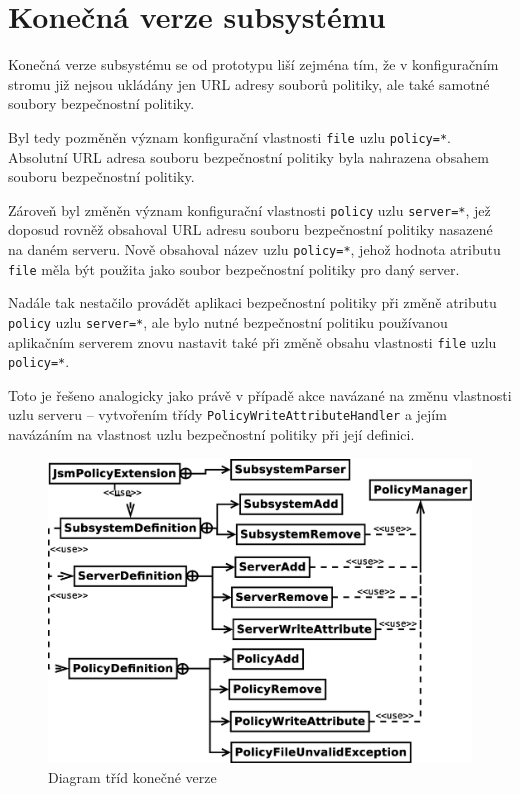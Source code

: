 \section{Konečná verze subsystému}

Konečná verze subsystému se od prototypu liší zejména tím, že v konfiguračním stromu již nejsou ukládány jen URL adresy souborů politiky, ale také samotné soubory bezpečnostní politiky.

Byl tedy pozměněn význam konfigurační vlastnosti {\tt file} uzlu {\tt policy=*}. Absolutní URL adresa souboru bezpečnostní politiky byla nahrazena obsahem souboru bezpečnostní politiky.

Zároveň byl změněn význam konfigurační vlastnosti {\tt policy} uzlu {\tt server=*}, jež doposud rovněž obsahoval URL adresu souboru bezpečnostní politiky nasazené na daném serveru.
Nově obsahoval název uzlu {\tt policy=*}, jehož hodnota atributu {\tt file} měla být použita jako soubor bezpečnostní politiky pro daný server.

Nadále tak nestačilo provádět aplikaci bezpečnostní politiky při změně atributu {\tt policy} uzlu {\tt server=*}, ale bylo nutné bezpečnostní politiku používanou aplikačním serverem znovu nastavit také při změně obsahu vlastnosti {\tt file} uzlu {\tt policy=*}.

Toto je řešeno analogicky jako právě v případě akce navázané na změnu vlastnosti uzlu serveru -- vytvořením třídy {\tt PolicyWriteAttributeHandler} a jejím navázáním na vlastnost uzlu bezpečnostní politiky při její definici.

\begin{figure}[ht]
  \centering
  \includegraphics[width=12cm]{fig/tridy2}
  \caption{Diagram tříd konečné verze}
  \label{tridy2}
\end{figure}

